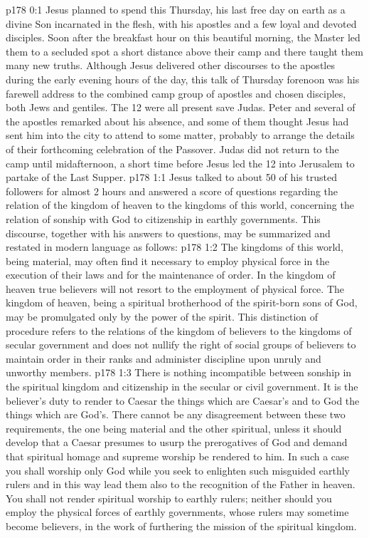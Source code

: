 \author{Midwayer Commission}
\vs p178 0:1 Jesus planned to spend this Thursday, his last free day on earth as a divine Son incarnated in the flesh, with his apostles and a few loyal and devoted disciples. Soon after the breakfast hour on this beautiful morning, the Master led them to a secluded spot a short distance above their camp and there taught them many new truths. Although Jesus delivered other discourses to the apostles during the early evening hours of the day, this talk of Thursday forenoon was his farewell address to the combined camp group of apostles and chosen disciples, both Jews and gentiles. The 12 were all present save Judas. Peter and several of the apostles remarked about his absence, and some of them thought Jesus had sent him into the city to attend to some matter, probably to arrange the details of their forthcoming celebration of the Passover. Judas did not return to the camp until midafternoon, a short time before Jesus led the 12 into Jerusalem to partake of the Last Supper.
\vs p178 1:1 Jesus talked to about 50 of his trusted followers for almost 2 hours and answered a score of questions regarding the relation of the kingdom of heaven to the kingdoms of this world, concerning the relation of sonship with God to citizenship in earthly governments. This discourse, together with his answers to questions, may be summarized and restated in modern language as follows:
\vs p178 1:2 \pc The kingdoms of this world, being material, may often find it necessary to employ physical force in the execution of their laws and for the maintenance of order. In the kingdom of heaven true believers will not resort to the employment of physical force. The kingdom of heaven, being a spiritual brotherhood of the spirit\hyp{}born sons of God, may be promulgated only by the power of the spirit. This distinction of procedure refers to the relations of the kingdom of believers to the kingdoms of secular government and does not nullify the right of social groups of believers to maintain order in their ranks and administer discipline upon unruly and unworthy members.
\vs p178 1:3 There is nothing incompatible between sonship in the spiritual kingdom and citizenship in the secular or civil government. It is the believer’s duty to render to Caesar the things which are Caesar’s and to God the things which are God’s. There cannot be any disagreement between these two requirements, the one being material and the other spiritual, unless it should develop that a Caesar presumes to usurp the prerogatives of God and demand that spiritual homage and supreme worship be rendered to him. In such a case you shall worship only God while you seek to enlighten such misguided earthly rulers and in this way lead them also to the recognition of the Father in heaven. You shall not render spiritual worship to earthly rulers; neither should you employ the physical forces of earthly governments, whose rulers may sometime become believers, in the work of furthering the mission of the spiritual kingdom.
